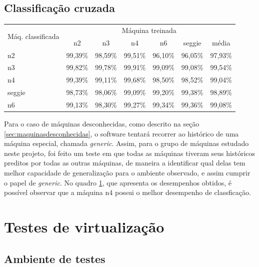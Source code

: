 \subsection{Classificação cruzada}

\begin{table}[htp]
\centering
\hspace{-2cm} %
\label{quadro:clacruzada}
\begin{tabular}{| l | c | c | c | c | c | c |}
\hline
\multirow{2}{*}{Máq. classificada} & \multicolumn{6}{c|}{Máquina treinada} \\
\cline{2-7}
		& n2      & n3       & n4      	 & n6        & seggie  	 & média   \\
\hline
n2      	& 99,39\%  & 98,59\% &   99,51\% &   96,10\% &   96,05\% & 97,93\% \\
n3      	& 99,82\%  & 99,78\% &   99,91\% &   99,09\% &   99,08\% & 99,54\% \\
n4      	& 99,39\%  & 99,11\% &   99,68\% &   98,50\% &   98,52\% & 99,04\% \\
seggie  	& 98,73\%  & 98,06\% &   99,09\% &   99,20\% &   99,38\% & 98,89\% \\
n6      	& 99,13\%  & 98,30\% &   99,27\% &   99,34\% &   99,36\% & 99,08\% \\
\hline
\end{tabular}
\end{table}

Para o caso de máquinas desconhecidas, como descrito na seção
\ref{sec:maquinasdesconhecidas}, o software tentará recorrer ao histórico
de uma máquina especial, chamada \emph{generic}. Assim, para o grupo de
máquinas estudado neste projeto, foi feito um teste em que todas as
máquinas tiveram seus históricos preditos por todas as outras máquinas, de
maneira a identificar qual delas tem melhor capacidade de generalização
para o ambiente observado, e assim cumprir o papel de \emph{generic}. No quadro
\ref{quadro:clacruzada}, que apresenta os desempenhos obtidos, é possível
observar que a máquina n4 possui o melhor desempenho de classficação.

\section{Testes de virtualização}

\subsection{Ambiente de testes}

